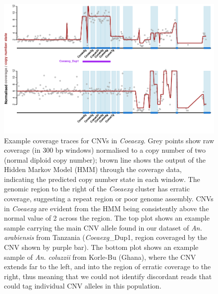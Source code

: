 \documentclass[a4paper,12pt]{article}
\begin{document}
\clearpage


\begin{figure}[h]
	\begin{center}
		\includegraphics*[width = 15cm]{../../CNV_analysis/CNV_extra_plots/example_plots_modified.pdf}
		\caption{\footnotesize Example coverage traces for CNVs in \textit{Coeaexg}. Grey points show raw coverage (in 300 bp windows) normalised to a copy number of two (normal diploid copy number); brown line shows the output of the Hidden Markov Model (HMM) through the coverage data, indicating the predicted copy number state in each window. The genomic region to the right of the \textit{Coeaexg} cluster has erratic coverage, suggesting a repeat region or poor genome assembly. CNVs in \textit{Coeaexg} are evident from the HMM being consistently above the normal value of 2 across the region. The top plot shows an example sample carrying the main CNV allele found in our dataset of \textit{An. arabiensis} from Tanzania (\textit{Coeaexg}\_Dup1, region coveraged by the CNV shown by purple bar). The bottom plot shows an example sample of \textit{An. coluzzii} from Korle-Bu (Ghana), where the CNV extends far to the left, and into the region of erratic coverage to the right, thus meaning that we could not identify discordant reads that could tag individual CNV alleles in this population.}
	\end{center}
	\label{FigS7}
\end{figure}
 

\clearpage
\end{document}
